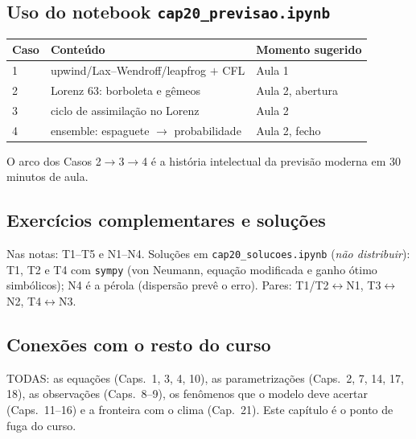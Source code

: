 \subsection*{Uso do notebook \texttt{cap20\_previsao.ipynb}}

\begin{center}
\begin{tabular}{lll}
\hline
Caso & Conteúdo & Momento sugerido \\
\hline
1 & upwind/Lax--Wendroff/leapfrog $+$ CFL & Aula 1 \\
2 & Lorenz 63: borboleta e gêmeos & Aula 2, abertura \\
3 & ciclo de assimilação no Lorenz & Aula 2 \\
4 & ensemble: espaguete $\to$ probabilidade & Aula 2, fecho \\
\hline
\end{tabular}
\end{center}

O arco dos Casos 2$\to$3$\to$4 é a história intelectual da previsão
moderna em 30 minutos de aula.

\subsection*{Exercícios complementares e soluções}

Nas notas: T1--T5 e N1--N4. Soluções em \texttt{cap20\_solucoes.ipynb}
(\emph{não distribuir}): T1, T2 e T4 com \texttt{sympy} (von Neumann,
equação modificada e ganho ótimo simbólicos); N4 é a pérola
(dispersão prevê o erro). Pares: T1/T2$\leftrightarrow$N1,
T3$\leftrightarrow$N2, T4$\leftrightarrow$N3.

\subsection*{Conexões com o resto do curso}

TODAS: as equações (Caps.~1, 3, 4, 10), as parametrizações
(Caps.~2, 7, 14, 17, 18), as observações (Caps.~8--9), os fenômenos
que o modelo deve acertar (Caps.~11--16) e a fronteira com o clima
(Cap.~21). Este capítulo é o ponto de fuga do curso.
